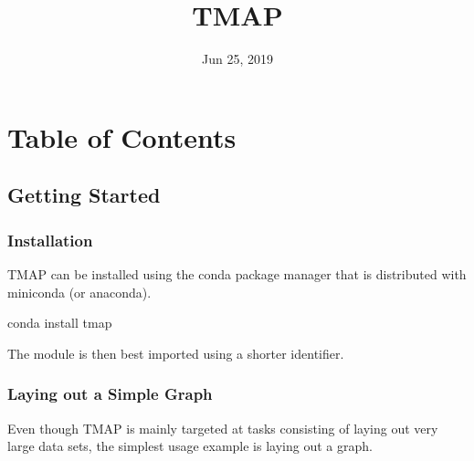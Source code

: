 \documentclass[letterpaper,10pt,english]{sphinxmanual}
\title{TMAP}
\date{Jun 25, 2019}
\author{}
\begin{document}
\pagestyle{empty}
\sphinxmaketitle
\pagestyle{plain}
\sphinxtableofcontents
\pagestyle{normal}
\label{\detokenize{index::doc}}



\chapter{Table of Contents}
\label{\detokenize{index:table-of-contents}}

\section{Getting Started}
\label{\detokenize{tutorial:getting-started}}\label{\detokenize{tutorial::doc}}

\subsection{Installation}
\label{\detokenize{tutorial:installation}}
TMAP can be installed using the conda package manager that
is distributed with miniconda (or anaconda).

\begin{sphinxVerbatim}[commandchars=\\\{\}]
conda install tmap
\end{sphinxVerbatim}

The module is then best imported using a shorter identifier.

\begin{sphinxVerbatim}[commandchars=\\\{\}]
   
\end{sphinxVerbatim}


\subsection{Laying out a Simple Graph}
\label{\detokenize{tutorial:laying-out-a-simple-graph}}
Even though TMAP is mainly targeted at tasks consisting of
laying out very large data sets, the simplest usage example
is laying out a graph.
\end{document}
